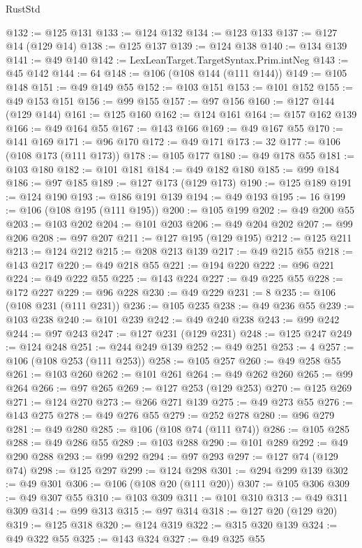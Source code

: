 \begin{lexlean}{RustStd}
\begin{coremodule}
{\begin{coremodule}
{{{{{@132 := @125 @131
@133 := @124 @132
@134 := @123 @133
@137 := @127 @14 (@129 @14)
@138 := @125 @137
@139 := @124 @138
@140 := @134 @139
@141 := @49 @140
@142 := LexLeanTarget.TargetSyntax.Prim.intNeg
@143 := @45 @142
@144 := 64
@148 := @106 (@108 @144 (@111 @144))
@149 := @105 @148
@151 := @49 @149 @55
@152 := @103 @151
@153 := @101 @152
@155 := @49 @153 @151
@156 := @99 @155
@157 := @97 @156
@160 := @127 @144 (@129 @144)
@161 := @125 @160
@162 := @124 @161
@164 := @157 @162 @139
@166 := @49 @164 @55
@167 := @143 @166
@169 := @49 @167 @55
@170 := @141 @169
@171 := @96 @170
@172 := @49 @171
@173 := 32
@177 := @106 (@108 @173 (@111 @173))
@178 := @105 @177
@180 := @49 @178 @55
@181 := @103 @180
@182 := @101 @181
@184 := @49 @182 @180
@185 := @99 @184
@186 := @97 @185
@189 := @127 @173 (@129 @173)
@190 := @125 @189
@191 := @124 @190
@193 := @186 @191 @139
@194 := @49 @193
@195 := 16
@199 := @106 (@108 @195 (@111 @195))
@200 := @105 @199
@202 := @49 @200 @55
@203 := @103 @202
@204 := @101 @203
@206 := @49 @204 @202
@207 := @99 @206
@208 := @97 @207
@211 := @127 @195 (@129 @195)
@212 := @125 @211
@213 := @124 @212
@215 := @208 @213 @139
@217 := @49 @215 @55
@218 := @143 @217
@220 := @49 @218 @55
@221 := @194 @220
@222 := @96 @221
@224 := @49 @222 @55
@225 := @143 @224
@227 := @49 @225 @55
@228 := @172 @227
@229 := @96 @228
@230 := @49 @229
@231 := 8
@235 := @106 (@108 @231 (@111 @231))
@236 := @105 @235
@238 := @49 @236 @55
@239 := @103 @238
@240 := @101 @239
@242 := @49 @240 @238
@243 := @99 @242
@244 := @97 @243
@247 := @127 @231 (@129 @231)
@248 := @125 @247
@249 := @124 @248
@251 := @244 @249 @139
@252 := @49 @251
@253 := 4
@257 := @106 (@108 @253 (@111 @253))
@258 := @105 @257
@260 := @49 @258 @55
@261 := @103 @260
@262 := @101 @261
@264 := @49 @262 @260
@265 := @99 @264
@266 := @97 @265
@269 := @127 @253 (@129 @253)
@270 := @125 @269
@271 := @124 @270
@273 := @266 @271 @139
@275 := @49 @273 @55
@276 := @143 @275
@278 := @49 @276 @55
@279 := @252 @278
@280 := @96 @279
@281 := @49 @280
@285 := @106 (@108 @74 (@111 @74))
@286 := @105 @285
@288 := @49 @286 @55
@289 := @103 @288
@290 := @101 @289
@292 := @49 @290 @288
@293 := @99 @292
@294 := @97 @293
@297 := @127 @74 (@129 @74)
@298 := @125 @297
@299 := @124 @298
@301 := @294 @299 @139
@302 := @49 @301
@306 := @106 (@108 @20 (@111 @20))
@307 := @105 @306
@309 := @49 @307 @55
@310 := @103 @309
@311 := @101 @310
@313 := @49 @311 @309
@314 := @99 @313
@315 := @97 @314
@318 := @127 @20 (@129 @20)
@319 := @125 @318
@320 := @124 @319
@322 := @315 @320 @139
@324 := @49 @322 @55
@325 := @143 @324
@327 := @49 @325 @55
}}}}}
\end{coremodule}}
\end{coremodule}
\end{lexlean}
